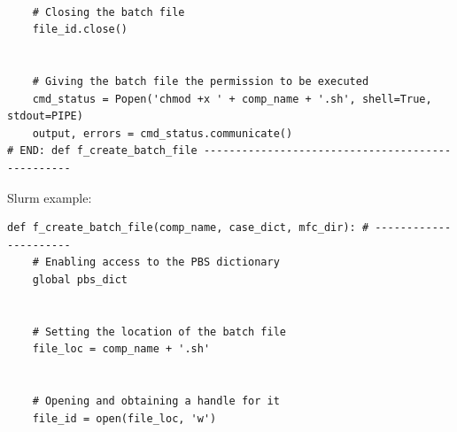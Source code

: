 \documentclass[11pt]{article}
\begin{document}
\begin{lstlisting}[style=BashInputStyle]
    
    # Closing the batch file
    file_id.close()
    
    
    # Giving the batch file the permission to be executed
    cmd_status = Popen('chmod +x ' + comp_name + '.sh', shell=True, stdout=PIPE)
    output, errors = cmd_status.communicate()
# END: def f_create_batch_file -------------------------------------------------
\end{lstlisting}

Slurm example: \\
\begin{lstlisting}[style=BashInputStyle]
def f_create_batch_file(comp_name, case_dict, mfc_dir): # ----------------------
    # Enabling access to the PBS dictionary
    global pbs_dict
    
    
    # Setting the location of the batch file
    file_loc = comp_name + '.sh'
    
    
    # Opening and obtaining a handle for it
    file_id = open(file_loc, 'w')
    

\end{lstlisting}
\end{document}
